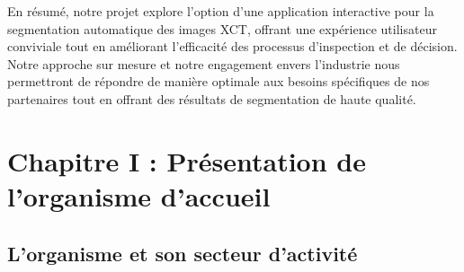\documentclass{report}
\newenvironment{mystyle}{
	\setlength{\parindent}{0pt} %
	\setlength{\parskip}{10pt} %
	\fontsize{12pt}{14pt}\selectfont %
}{
}
\let\oldchapter\chapter
\renewcommand{\chapter}[1]{\oldchapter{#1}}
\begin{document}
\begin{mystyle}
		En résumé, notre projet explore l'option d'une application interactive pour la segmentation automatique des images XCT, offrant une expérience utilisateur conviviale tout en améliorant l'efficacité des processus d'inspection et de décision. Notre approche sur mesure et notre engagement envers l'industrie nous permettront de répondre de manière optimale aux besoins spécifiques de nos partenaires tout en offrant des résultats de segmentation de haute qualité.
	\end{mystyle}


\restoregeometry

\renewcommand{\chaptername}{}

\fancyhead[L]{\leftmark \\ \vspace{30pt}}

\chapter{Chapitre I : Présentation de l’organisme d’accueil}

\section{L'organisme et son secteur d'activité }
\end{document}
